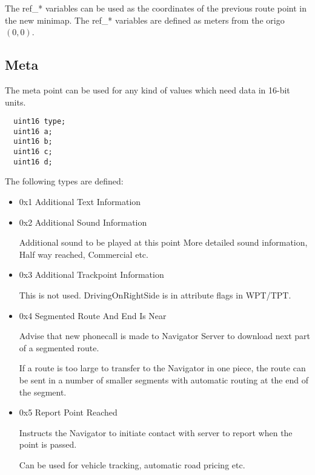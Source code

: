 \documentclass[a4paper]{article}
\begin{document}
  The ref\_* variables can be used as the coordinates of the previous
  route point in the new minimap.
  The ref\_* variables are defined as meters from the origo $ (0,0) $.

\subsection{Meta}

  The meta point can be used for any kind of values
  which need data in 16-bit units.

\begin{verbatim}
  uint16 type;
  uint16 a;
  uint16 b;
  uint16 c;
  uint16 d;
\end{verbatim}

The following types are defined:

\begin{itemize}

\item 0x1 Additional Text Information


\item 0x2 Additional Sound Information

Additional sound to be played at this point
More detailed sound information, Half way reached, Commercial etc.

\item 0x3 Additional Trackpoint Information

This is not used. DrivingOnRightSide is in attribute flags in WPT/TPT.

\item 0x4 Segmented Route And End Is Near

Advise that new phonecall is made to Navigator Server to download
next part of a segmented route.

If a route is too large to transfer to the Navigator in one piece,
the route can be sent in a number of smaller segments with automatic
routing at the end of the segment.

\item 0x5 Report Point Reached

Instructs the Navigator to initiate contact with server to
report when the point is passed.

Can be used for vehicle tracking, automatic road pricing etc.

\end{itemize}
\end{document}
